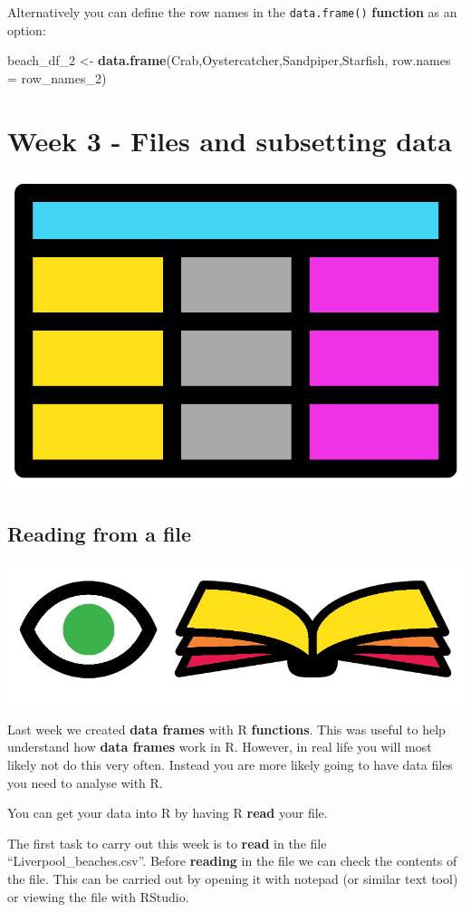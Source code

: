 \documentclass[]{book}
\newenvironment{Shaded}{\begin{snugshade}}{\end{snugshade}}
\newcommand{\KeywordTok}[1]{\textcolor[rgb]{0.13,0.29,0.53}{\textbf{#1}}}
\newcommand{\DataTypeTok}[1]{\textcolor[rgb]{0.13,0.29,0.53}{#1}}
\newcommand{\DecValTok}[1]{\textcolor[rgb]{0.00,0.00,0.81}{#1}}
\newcommand{\StringTok}[1]{\textcolor[rgb]{0.31,0.60,0.02}{#1}}
\newcommand{\NormalTok}[1]{#1}
\begin{document}
Alternatively you can define the row names in the \texttt{data.frame()}
\textbf{function} as an option:

\begin{Shaded}
\begin{Highlighting}[]
\NormalTok{beach_df_}\DecValTok{2}\NormalTok{ <-}\StringTok{ }\KeywordTok{data.frame}\NormalTok{(Crab,Oystercatcher,Sandpiper,Starfish, }\DataTypeTok{row.names =}\NormalTok{ row_names_}\DecValTok{2}\NormalTok{)}
\end{Highlighting}
\end{Shaded}

\chapter{Week 3 - Files and subsetting
data}\label{week-3---files-and-subsetting-data}

\begin{center}\includegraphics[width=0.2\linewidth]{figures/R_df} \end{center}

\section{Reading from a file}\label{reading-from-a-file}

\begin{center}\includegraphics[width=0.2\linewidth]{figures/r_read} \end{center}

Last week we created \textbf{data frames} with R \textbf{functions}.
This was useful to help understand how \textbf{data frames} work in R.
However, in real life you will most likely not do this very often.
Instead you are more likely going to have data files you need to analyse
with R.

You can get your data into R by having R \textbf{read} your file.

The first task to carry out this week is to \textbf{read} in the file
``Liverpool\_beaches.csv''. Before \textbf{reading} in the file we can
check the contents of the file. This can be carried out by opening it
with notepad (or similar text tool) or viewing the file with RStudio.
\end{document}
